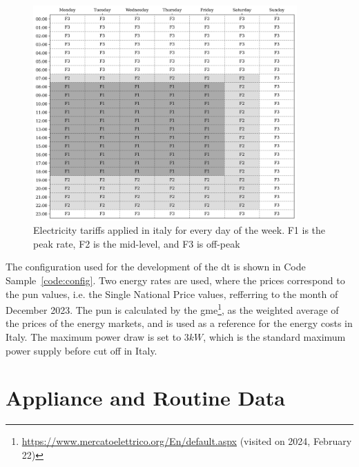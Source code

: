 \begin{figure}
    \centering
    \includegraphics[width=0.9\textwidth]{images/costs.png}
    \caption[Electricity tariffs applied in italy for every day of the week]{Electricity tariffs applied in italy for every day of the week. F1 is the peak rate, F2 is the mid-level, and F3 is off-peak}
    \label{fig:costs_matrix}
\end{figure}

The configuration used for the development of the \acrshort{dt} is shown in Code Sample~\ref{code:config}. Two energy rates are used, where the prices correspond to the \acrfull{pun} values, i.e. the Single National Price values, refferring to the month of December 2023. The \acrshort{pun} is calculated by the \acrfull{gme}\footnote{\url{https://www.mercatoelettrico.org/En/default.aspx} (visited on 2024, February 22)}, as the weighted average of the prices of the energy markets, and is used as a reference for the energy costs in Italy. The maximum power draw is set to $3kW$, which is the standard maximum power supply before cut off in Italy.

\section{Appliance and Routine Data}

